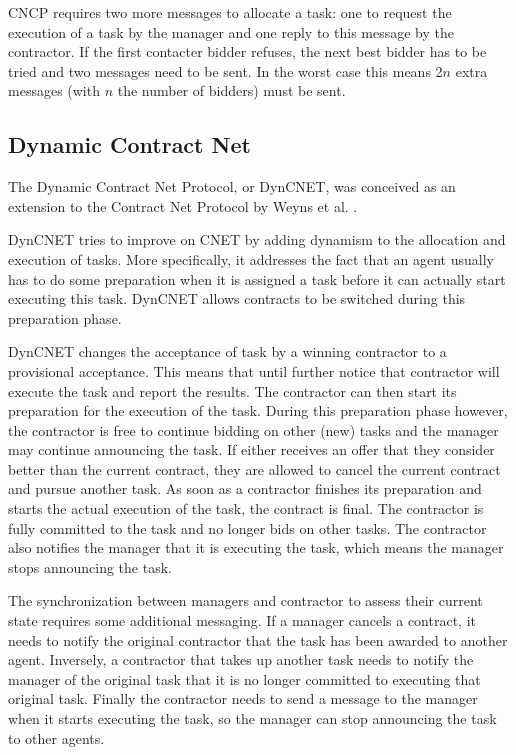 \documentclass[10pt,a4paper,twocolumn]{article}
\begin{document}
CNCP requires two more messages to allocate a task: one to request the execution of a task by the manager and one reply to this message by the contractor. If the first contacter bidder refuses, the next best bidder has to be tried and two messages need to be sent. In the worst case this means 2$n$ extra messages (with $n$ the number of bidders) must be sent.

\subsection{Dynamic Contract Net}
The Dynamic Contract Net Protocol, or DynCNET, was conceived as an extension to the Contract Net Protocol by Weyns et al. \cite{DynCNET, weyns2007dyncnet, DBLP:conf/eumas/WeynsBHS06}. 

DynCNET tries to improve on CNET by adding dynamism to the allocation and execution of tasks. More specifically, it addresses the fact that an agent usually has to do some preparation when it is assigned a task before it can actually start executing this task. DynCNET allows contracts to be switched during this preparation phase.

DynCNET changes the acceptance of task by a winning contractor to a provisional acceptance. This means that until further notice that contractor will execute the task and report the results. The contractor can then start its preparation for the execution of the task. During this preparation phase however, the contractor is free to continue bidding on other (new) tasks and the manager may continue announcing the task. If either receives an offer that they consider better than the current contract, they are allowed to cancel the current contract and pursue another task. As soon as a contractor finishes its preparation and starts the actual execution of the task, the contract is final. The contractor is fully committed to the task and no longer bids on other tasks. The contractor also notifies the manager that it is executing the task, which means the manager stops announcing the task.

The synchronization between managers and contractor to assess their current state requires some additional messaging. If a manager cancels a contract, it needs to notify the original contractor that the task has been awarded to another agent. Inversely, a contractor that takes up another task needs to notify the manager of the original task that it is no longer committed to executing that original task. Finally the contractor needs to send a message to the manager when it starts executing the task, so the manager can stop announcing the task to other agents.
\end{document}
